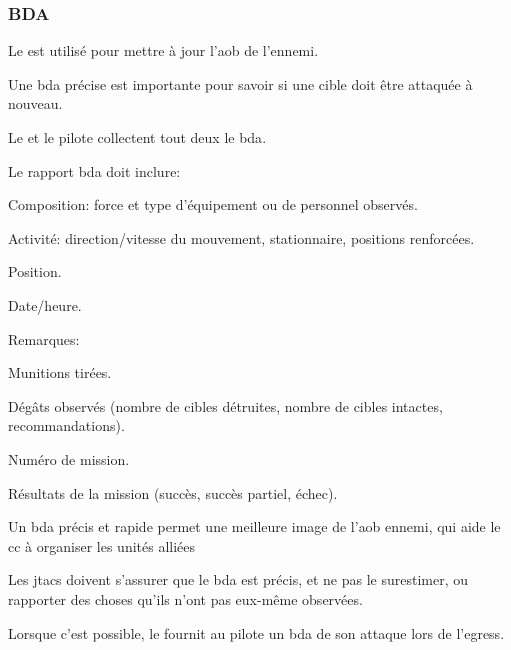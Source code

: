 \subsubsection{BDA}%

\begin{e1}
	
	\item Le  est utilisé pour mettre à jour l'\gls{aob} de l'ennemi.
	
	Une \gls{bda} précise est importante pour savoir si une cible doit être attaquée à nouveau.
	
	Le \ja{} et le pilote collectent tout deux le \gls{bda}.
	
	Le rapport \gls{bda} doit inclure:
	
	\begin{e2}
		
		\item Composition: force et type d'équipement ou de personnel observés.
		\item Activité: direction/vitesse du mouvement, stationnaire, positions renforcées.
		\item Position.
		\item Date/heure.
		\item Remarques:
		\begin{e3}
			\item Munitions tirées.
			\item Dégâts observés (nombre de cibles détruites, nombre de cibles intactes, recommandations).
			\item Numéro de mission.
			\item Résultats de la mission (succès, succès partiel, échec).
			
		\end{e3}
	\end{e2}
	
	\item Un \gls{bda} précis et rapide permet une meilleure image de l'\gls{aob} ennemi, qui aide le \gls{cc} à organiser les unités alliées
	
	\item Les \glspl{jtac} doivent s'assurer que le \gls{bda} est précis, et ne pas le surestimer, ou rapporter des choses qu'ils n'ont pas eux-même observées.
	
	\itemt{Responsabilités du \ja{}:}{}
		
		\begin{e2}
			
			\item Lorsque c'est possible, le \ja{} fournit au pilote un \gls{bda} de son attaque lors de l'egress.
			

\end{e2}
\end{e1}
